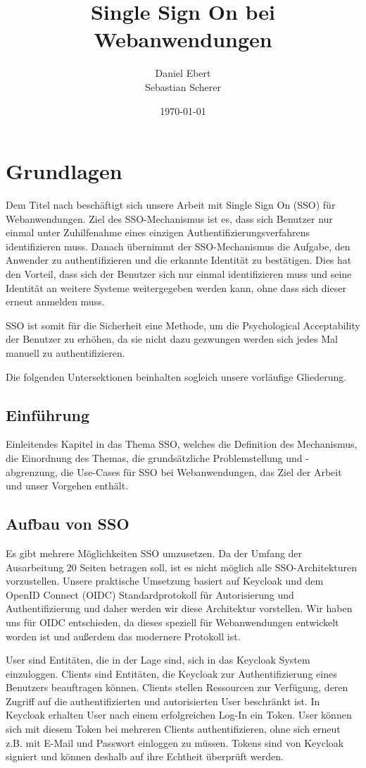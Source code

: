 \documentclass[12pt]{article}
\title{Single Sign On bei Webanwendungen}
\author{Daniel Ebert \\
	Sebastian Scherer}
\date{\today}
\begin{document}
\maketitle
	
\section{Grundlagen}
Dem Titel nach beschäftigt sich unsere Arbeit mit Single Sign On (SSO) für Webanwendungen.
Ziel des SSO-Mechanismus ist es, dass sich Benutzer nur einmal unter Zuhilfenahme eines einzigen Authentifizierungsverfahrens identifizieren muss.
Danach übernimmt der SSO-Mechanismus die Aufgabe, den Anwender zu authentifizieren und die erkannte Identität zu bestätigen. Dies hat den Vorteil, dass sich der Benutzer sich nur einmal identifizieren muss und seine Identität an weitere Systeme weitergegeben werden kann, ohne dass sich dieser erneut anmelden muss.

SSO ist somit für die Sicherheit eine Methode, um die Psychological Acceptability der Benutzer zu erhöhen, da sie nicht dazu gezwungen werden sich jedes Mal manuell zu authentifizieren.

Die folgenden Untersektionen beinhalten sogleich unsere vorläufige Gliederung.

\subsection{Einführung}	
Einleitendes Kapitel in das Thema SSO, welches die Definition des Mechanismus, die Einordnung des Themas, die grundsätzliche Problemstellung und -abgrenzung, die Use-Cases für SSO bei Webanwendungen, das Ziel der Arbeit und unser Vorgehen enthält.

\subsection{Aufbau von SSO}
Es gibt mehrere Möglichkeiten SSO umzusetzen. Da der Umfang der Ausarbeitung 20 Seiten betragen soll, ist es nicht möglich alle SSO-Architekturen vorzustellen. Unsere praktische Umsetzung basiert auf Keycloak und dem OpenID Connect (OIDC) Standardprotokoll für Autorisierung und Authentifizierung und daher werden wir diese Architektur vorstellen. Wir haben uns für OIDC entschieden, da dieses speziell für Webanwendungen entwickelt worden ist und außerdem das modernere Protokoll ist. \cite{keycloakOpenID}

User sind Entitäten, die in der Lage sind, sich in das Keycloak System einzuloggen. Clients sind Entitäten, die Keycloak zur Authentifizierung eines Benutzers beauftragen können. Clients stellen Ressourcen zur Verfügung, deren Zugriff auf die authentifizierten und autorisierten User beschränkt ist. In Keycloak erhalten User nach einem erfolgreichen Log-In ein Token. User können sich mit diesem Token bei mehreren Clients authentifizieren, ohne sich erneut z.B. mit E-Mail und Passwort einloggen zu müssen. Tokens sind von Keycloak signiert und können deshalb auf ihre Echtheit überprüft werden.
\end{document}
